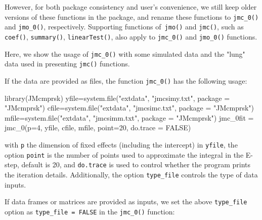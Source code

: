 However, for both package consistency and user's convenience, we still keep older versions of these functions in the package, and rename these functions to \texttt{jmc\_0()} and \texttt{jmo\_0()}, respectively. Supporting functions of\texttt{ jmo()} and \texttt{jmc()}, such as \texttt{coef()}, \texttt{summary()}, \texttt{linearTest()}, also apply to \texttt{jmc\_0()} and \texttt{jmo\_0()} functions.

Here, we show the usage of \texttt{jmc\_0()} with some simulated data and the "lung" data used in presenting \texttt{jmc()}  functions.

If the data are provided as files, the function \texttt{jmc\_0()} has the following usage:

\begin{example}
library(JMcmprsk)
yfile=system.file("extdata", "jmcsimy.txt", package = "JMcmprsk")
cfile=system.file("extdata", "jmcsimc.txt", package = "JMcmprsk")
mfile=system.file("extdata", "jmcsimm.txt", package = "JMcmprsk")
jmc_0fit = jmc_0(p=4, yfile, cfile, mfile, point=20, do.trace = FALSE)
\end{example}

with \texttt{p} the dimension of fixed effects (including the intercept) in \texttt{yfile}, the option \texttt{point} is the number of points used to approximate the integral in the E-step, default is 20, and \texttt{do.trace} is used to control whether the program prints the iteration details. Additionally, the option \texttt{type\_file} controls the type of data inputs.

If data frames or matrices are provided as inputs, we set the above \texttt{type\_file} option as \texttt{type\_file = FALSE} in the \texttt{jmc\_0()} function:


